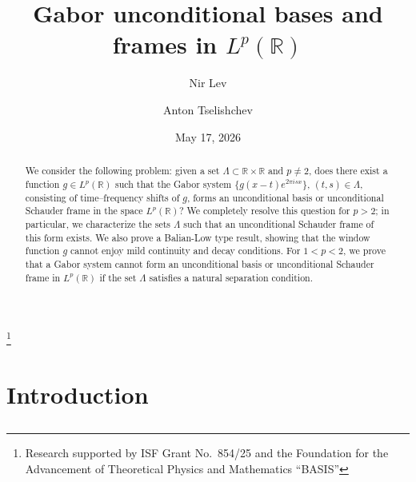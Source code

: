 \documentclass[reqno,a4paper,12pt]{amsart}
\numberwithin{equation}{section}
\numberwithin{figure}{section}
\newcommand\R{\mathbb{R}}
\newcommand\1{\mathds{1}}
\theoremstyle{plain}
\theoremstyle{definition}
\begin{document}
\title{Gabor unconditional bases and frames in $L^p(\R)$}

\author{Nir Lev}
\address{Department of Mathematics, Bar-Ilan University, Ramat-Gan 5290002, Israel}

\author{Anton Tselishchev}
\address{St. Petersburg Department of Steklov Mathematical Institute, Fontanka 27, St. Petersburg 191023, Russia}


\date{May 17, 2026}
\thanks{Research supported by ISF Grant No.\ 854/25 and the Foundation for the Advancement of Theoretical Physics and Mathematics ``BASIS''}



\begin{abstract}
We consider the following problem: given a set $\Lambda \subset \mathbb{R} \times \mathbb{R}$ and $p \neq 2$, does there exist a function $g \in L^p(\mathbb{R})$ such that the Gabor system $\{g(x-t) e^{2\pi i s x}\}$, $(t,s) \in \Lambda$, consisting of time--frequency shifts of $g$, forms an unconditional basis or unconditional Schauder frame in the space $L^p(\mathbb{R})$? We completely resolve this question for $p>2$; in particular, we characterize the sets $\Lambda$ such that an unconditional Schauder frame of this form exists. We also prove a Balian-Low type result, showing that the window function $g$ cannot enjoy mild continuity and decay conditions. For $1<p<2$, we prove that a Gabor system cannot form an unconditional basis or unconditional Schauder frame in $L^p(\mathbb{R})$ if the set $\Lambda$ satisfies a natural separation condition.
\end{abstract}



\maketitle





\section{Introduction}

\subsection{}
\end{document}
